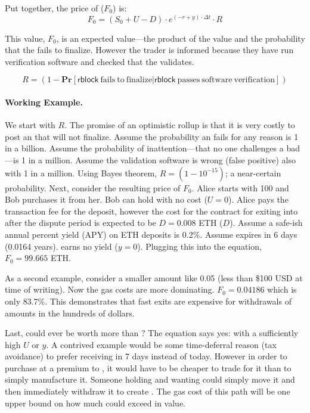 Put together, the price of \ethxx ($F_0$) is: \[ F_0 = (S_0 + U - D)\cdot e^{(-r+y)\cdot\Delta t} \cdot R \]

This value, $F_0$, is an expected value---the product of the value and the probability that the \rblock fails to finalize. However the trader is informed because they have run verification software and checked that the \rblock validates.


\[ R = (1-\mathbf{Pr}[ \mathrm{\mathsf{rblock}~fails~to~finalize} |  \mathrm{\mathsf{rblock}~passes~software~verification} ]) \]

\paragraph{Working Example.} We start with $R$. The promise of an optimistic rollup is that it is very costly to post an \rblock that will not finalize. Assume the probability an \rblock fails for any reason is 1 in a billion. Assume the probability of inattention---that no one challenges a bad \rblock---is 1 in a million. Assume the validation software is wrong (false positive) also with 1 in a million. Using Bayes theorem, $R=(1-10^{-15})$; a near-certain probability. Next, consider the resulting price of $F_0$. Alice starts with 100 \ethxx and Bob purchases it from her. Bob can hold \ethxx with no cost ($U=0$). Alice pays the transaction fee for the deposit, however the cost for the contract for exiting \ethxx into \ethone after the dispute period is expected to be $D=0.008$ ETH ($D$). Assume a safe-ish annual percent yield (APY) on ETH deposits is 0.2\%. Assume \ethxx expires in 6 days (0.0164 years). \ethxx earns no yield ($y=0$). Plugging this into the equation, $F_0=99.665$ ETH.

As a second example, consider a smaller amount like 0.05 \ethxx (less than \$100 USD at time of writing). Now the gas costs are more dominating. $F_0=0.04186$ \ethone which is only 83.7\%. This demonstrates that fast exits are expensive for withdrawals of amounts in the hundreds of dollars.

Last, could \ethxx ever be worth more than \ethone? The equation says yes: with a sufficiently high $U$ or $y$. A contrived example would be some time-deferral reason (\eg tax avoidance) to prefer receiving \ethone in 7 days instead of today. However in order to purchase \ethxx at a premium to \ethone, it would have to be cheaper to trade for it than to simply manufacture it. Someone holding \ethone and wanting \ethxx could simply move it \layertwo and then immediately withdraw it to create \ethxx. The gas cost of this path will be one upper bound on how much \ethxx could exceed \ethone in value. 

